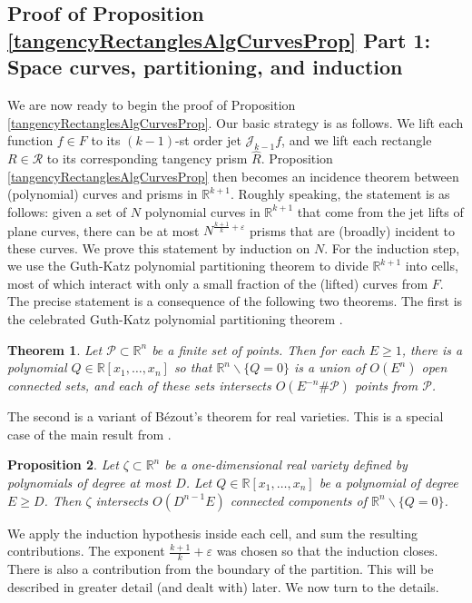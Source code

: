 \documentclass[letterpaper, reqno,11pt]{article}
\numberwithin{equation}{section}
\newcommand{\RR}{\mathbb{R}}
\newcommand{\eps}{\varepsilon}
\newtheorem{thm}{Theorem}
\numberwithin{thm}{section}
\newtheorem{prop}[thm]{Proposition}
\theoremstyle{remark}
\begin{document}


\subsection{Proof of Proposition \ref{tangencyRectanglesAlgCurvesProp} Part 1: Space curves, partitioning, and induction}\label{proofOfProptangencyRectanglesAlgCurvesPropPt1Sec}
%
We are now ready to begin the proof of Proposition \ref{tangencyRectanglesAlgCurvesProp}. Our basic strategy is as follows. We lift each function $f\in F$ to its $(k-1)$-st order jet $\mathcal{J}_{k-1}f$, and we lift each rectangle $R\in\mathcal{R}$ to its corresponding tangency prism $\hat R$. Proposition \ref{tangencyRectanglesAlgCurvesProp} then becomes an incidence theorem between (polynomial) curves and prisms in $\RR^{k+1}$. Roughly speaking, the statement is as follows: given a set of $N$ polynomial curves in $\RR^{k+1}$ that come from the jet lifts of plane curves, there can be at most $N^{\frac{k+1}{k}+\eps}$ prisms that are (broadly) incident to these curves. We prove this statement by induction on $N$. For the induction step, we use the Guth-Katz polynomial partitioning theorem to divide $\RR^{k+1}$ into cells, most of which interact with only a small fraction of the (lifted) curves from $F$. The precise statement is a consequence of the following two theorems. The first is the celebrated Guth-Katz polynomial partitioning theorem \cite{GuthKatz}.

\begin{thm}\label{polyPartitioningTheorem}
Let $\mathcal{P}\subset\RR^n$ be a finite set of points. Then for each $E\geq 1$, there is a polynomial $Q\in\RR[x_1,\ldots,x_n]$ so that $\RR^n\backslash \{Q=0\}$ is a union of $O(E^n)$ open connected sets, and each of these sets intersects $O(E^{-n}\#\mathcal{P})$ points from $\mathcal{P}$.
\end{thm}

The second is a variant of B\'ezout's theorem for real varieties. This is a special case of the main result from \cite{BaroneBasu}.
\begin{prop}\label{BBProp}
Let $\zeta\subset\RR^n$ be a one-dimensional real variety defined by polynomials of degree at most $D$. Let $Q\in\RR[x_1,\ldots,x_n]$ be a polynomial of degree $E\geq D$. Then $\zeta$ intersects $O(D^{n-1}E)$ connected components of $\RR^n\backslash\{Q=0\}$. 
\end{prop}


We apply the induction hypothesis inside each cell, and sum the resulting contributions. The exponent $\frac{k+1}{k}+\eps$ was chosen so that the induction closes. There is also a contribution from the boundary of the partition. This will be described in greater detail (and dealt with) later. We now turn to the details.
\end{document}
